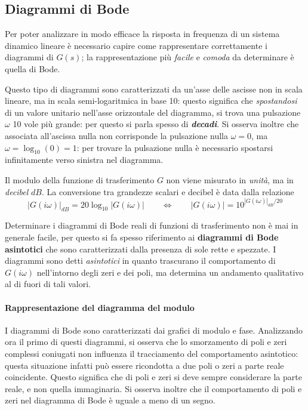 		
	\subsection{Diagrammi di Bode}
		Per poter analizzare in modo efficace la risposta in frequenza di un sistema dinamico lineare è necessario capire come rappresentare correttamente i diagrammi di $G(s)$; la rappresentazione più \textit{facile} e \textit{comoda} da determinare è quella di Bode.
		
		Questo tipo di diagrammi sono caratterizzati da un'asse delle ascisse non in scala lineare, ma in scala semi-logaritmica in base 10: questo significa che \textit{spostandosi} di un valore unitario nell'asse orizzontale del diagramma, si trova una pulsazione $\omega$ 10 vole più grande: per questo si parla spesso di \textbf{\textit{decadi}}. Si osserva inoltre che associata all'ascissa nulla non corrisponde la pulsazione nulla $\omega=0$, ma $\omega = \log_{10}(0) = 1$: per trovare la pulsazione nulla è necessario spostarsi infinitamente verso sinistra nel diagramma.
		
		Il modulo della funzione di trasferimento $G$ non viene misurato in \textit{unità}, ma in \textit{decibel} $dB$. La conversione tra grandezze scalari e decibel è data dalla relazione
		\[ |G(i\omega)|_{dB} = 20 \log_{10} |G(i\omega)| \qquad \Leftrightarrow \qquad |G(i\omega)| = 10 ^{|G(i\omega)|_{dB}/20}  \]
		
		Determinare i diagrammi di Bode reali di funzioni di trasferimento non è mai in generale facile, per questo si fa spesso riferimento ai \textbf{diagrammi di Bode asintotici} che sono caratterizzati dalla presenza di sole rette e spezzate. I diagrammi sono detti \textit{asintotici} in quanto trascurano il comportamento di $G(i\omega)$ nell'intorno degli zeri e dei poli, ma determina un andamento qualitativo al di fuori di tali valori.
		
		\paragraph{Rappresentazione del diagramma del modulo} I diagrammi di Bode sono caratterizzati  dai grafici di modulo e fase. Analizzando ora il primo di questi diagrammi, si osserva che lo smorzamento di poli e zeri complessi coniugati non influenza il tracciamento del comportamento asintotico: questa situazione infatti può essere ricondotta a due poli o zeri a parte reale coincidente. Questo significa che di poli e zeri si deve sempre considerare la parte reale, e non quella immaginaria. Si osserva inoltre che il comportamento di poli e zeri nel diagramma di Bode è uguale a meno di un segno.
		
